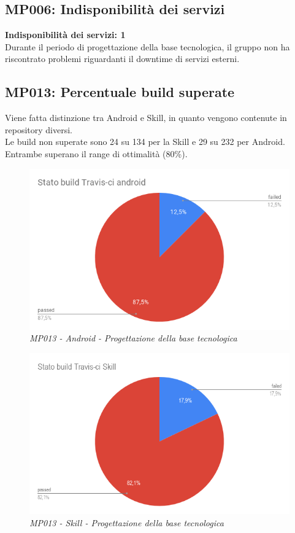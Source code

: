 \subsection{MP006: Indisponibilità dei servizi}
\textbf{Indisponibilità dei servizi: 1}\\
Durante il periodo di progettazione della base tecnologica, il gruppo non ha riscontrato problemi riguardanti il downtime di servizi esterni.

\subsection{MP013: Percentuale build superate}
Viene fatta distinzione tra Android e Skill, in quanto vengono contenute in repository diversi.\\
Le build non superate sono 24 su 134 per la Skill e 29 su 232 per Android. Entrambe superano il range di ottimalità (80\%).\\
\begin{figure} [H]
    \centering
	\includegraphics[scale=0.5]{./images/StatobuildTravis-CIandroid.png}
    \caption{\textit{MP013 - Android - Progettazione della base tecnologica}}\label{}
\end{figure}
\begin{figure} [H]
    \centering
	\includegraphics[scale=0.5]{./images/StatobuildTravis-CISkill.png}
    \caption{\textit{MP013 - Skill - Progettazione della base tecnologica}}\label{}
\end{figure}

